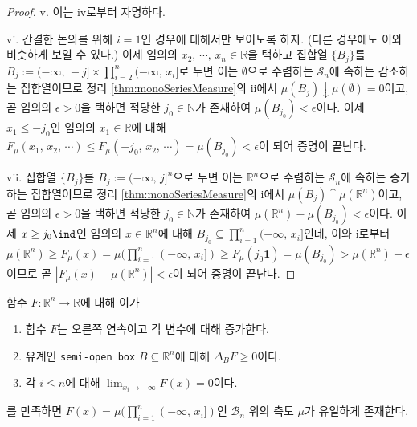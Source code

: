 \begin{proof}
    v. 이는 iv로부터 자명하다.

    vi. 간결한 논의를 위해 $i=1$인 경우에 대해서만 보이도록 하자. (다른 경우에도 이와 비슷하게 보일 수 있다.) 이제 임의의 $x_2,\,\cdots,\,x_n\in\mathbb{R}$을 택하고 집합열 $\{B_j\}$를 $B_j:=(-\infty,\,-j]\times\prod_{i=2}^n(-\infty,\,x_i]$로 두면 이는 $\emptyset$으로 수렴하는 $\mathcal{S}_n$에 속하는 감소하는 집합열이므로 정리 \ref{thm:monoSeriesMeasure}의 ii에서 $\mu(B_j)\downarrow\mu(\emptyset)=0$이고, 곧 임의의 $\epsilon>0$을 택하면 적당한 $j_0\in\mathbb{N}$가 존재하여 $\mu(B_{j_0})<\epsilon$이다. 이제 $x_1\leq-j_0$인 임의의 $x_1\in\mathbb{R}$에 대해 $F_\mu(x_1,\,x_2,\,\cdots)\leq F_\mu(-j_0,\,x_2,\,\cdots)=\mu(B_{j_0})<\epsilon$이 되어 증명이 끝난다.

    vii. 집합열 $\{B_j\}$를 $B_j:=(-\infty,\,j]^n$으로 두면 이는 $\mathbb{R}^n$으로 수렴하는 $\mathcal{S}_n$에 속하는 증가하는 집합열이므로 정리 \ref{thm:monoSeriesMeasure}의 i에서 $\mu(B_j)\uparrow\mu(\mathbb{R}^n)$이고, 곧 임의의 $\epsilon>0$을 택하면 적당한 $j_0\in\mathbb{N}$가 존재하여 $\mu(\mathbb{R}^n)-\mu(B_{j_0})<\epsilon$이다. 이제 $x\geq j_0\ind$인 임의의 $x\in\mathbb{R}^n$에 대해 $B_{j_0}\subseteq\prod_{i=1}^n(-\infty,\,x_i]$인데, 이와 i로부터 $\mu(\mathbb{R}^n)\geq F_\mu(x)=\mu(\prod_{i=1}^n(-\infty,\,x_i])\geq F_\mu(j_0\mathbf{1})=\mu(B_{j_0})>\mu(\mathbb{R}^n)-\epsilon$이므로 곧 $|F_\mu(x)-\mu(\mathbb{R}^n)|<\epsilon$이 되어 증명이 끝난다.
\end{proof}

\begin{theorem}\label{thm:finiteBorelSpecify}
    함수 $F:\mathbb{R}^n\to\mathbb{R}$에 대해 이가
    \begin{enumerate}
        \item 함수 $F$는 오른쪽 연속이고 각 변수에 대해 증가한다.
        \item 유계인  \texttt{semi-open box} $B\subseteq\mathbb{R}^n$에 대해 $\Delta_BF\geq0$이다.
        \item 각 $i\leq n$에 대해 $\lim_{x_i\to-\infty}F(x)=0$이다.
    \end{enumerate}
    를 만족하면 $F(x)=\mu(\prod_{i=1}^n(-\infty,\,x_i])$인 $\mathcal{B}_n$ 위의 측도 $\mu$가 유일하게 존재한다.
\end{theorem}

